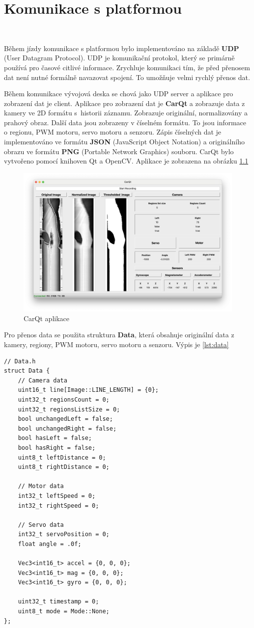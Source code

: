 \chapter{Komunikace s platformou}
\label{sec:PlatformCommunication}
\vspace{-20pt}
\

Během jízdy komunikace s platformou bylo implementováno na základě \textbf{UDP}
(User Datagram Protocol).  UDP je komunikační protokol,
který se primárně používá pro časové citlivé informace.
Zrychluje komunikaci tím, že před přenosem dat není nutné formálně navazovat spojení.
To umožňuje velmi rychlý přenos dat\cite{UDP}.

Během komunikace vývojová deska se chová jako UDP server a aplikace pro zobrazení dat
je client. Aplikace pro zobrazení dat je \textbf{CarQt} a zobrazuje data z kamery
ve 2D formátu  s~historii záznamu. Zobrazuje originální,
normalizovány a prahový obraz. Další data
jsou zobrazeny v číselném formátu. To jsou informace o regionu, PWM motoru, servo motoru
a senzoru. Zápis číselných dat je implementováno ve formátu \textbf{JSON}
(JavaScript Object Notation) a originálního obrazu ve formátu \textbf{PNG}
(Portable Network Graphics) souboru. CarQt bylo vytvořeno pomocí knihoven Qt a OpenCV.
Aplikace je zobrazena na obrázku \ref{fig:CarQt}
\begin{figure}[!h]
    \centering
    \includegraphics[width = .5\linewidth]{Figures/CarQt.png}
    \caption{CarQt aplikace}
    \label{fig:CarQt}
\end{figure}


Pro přenos data se použita struktura \textbf{Data}, která obsahuje originální data z kamery, regiony, PWM motoru, servo motoru a senzoru. Výpis je \ref{lst:data}
\begin{lstlisting}[caption=structura Data, label=lst:data]
// Data.h
struct Data {
    // Camera data
    uint16_t line[Image::LINE_LENGTH] = {0};
    uint32_t regionsCount = 0;
    uint32_t regionsListSize = 0;
    bool unchangedLeft = false;
    bool unchangedRight = false;
    bool hasLeft = false;
    bool hasRight = false;
    uint8_t leftDistance = 0;
    uint8_t rightDistance = 0;

    // Motor data
    int32_t leftSpeed = 0;
    int32_t rightSpeed = 0;

    // Servo data
    int32_t servoPosition = 0;
    float angle = .0f;

    Vec3<int16_t> accel = {0, 0, 0};
    Vec3<int16_t> mag = {0, 0, 0};
    Vec3<int16_t> gyro = {0, 0, 0};

    uint32_t timestamp = 0;
    uint8_t mode = Mode::None;
};
\end{lstlisting}

\endinput
